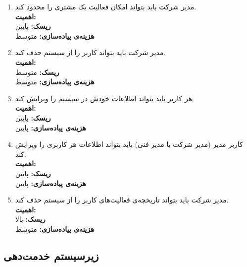 \begin{enumerate}
\item 
مدیر شرکت باید بتواند امکان فعالیت یک مشتری را محدود کند.
\\
\textbf{اهمیت:} 
\\
\textbf{ریسک:} پایین
\\
\textbf{هزینه‌ی پیاده‌سازی:} متوسط
\item 
مدیر شرکت باید بتواند کاربر را از سیستم حذف کند.
\\
\textbf{اهمیت:} 
\\
\textbf{ریسک:} متوسط
\\
\textbf{هزینه‌ی پیاده‌سازی:} متوسط

\item 
هر کاربر باید بتواند اطلاعات خودش در سیستم را ویرایش کند.
 \\
\textbf{اهمیت:} 
\\
\textbf{ریسک:} پایین
\\
\textbf{هزینه‌ی پیاده‌سازی:} پایین
\item 
کاربر مدیر ‌(مدیر شرکت یا مدیر فنی) باید بتواند اطلاعات هر کاربری را ویرایش کند.
 \\
\textbf{اهمیت:} 
\\
\textbf{ریسک:} پایین
\\
\textbf{هزینه‌ی پیاده‌سازی:} پایین

\item 
مدیر شرکت باید بتواند تاریخچه‌ی فعالیت‌های کاربر را از سیستم حذف کند.
\\
\textbf{اهمیت:} 
\\
\textbf{ریسک:} بالا
\\
\textbf{هزینه‌ی پیاده‌سازی:} متوسط


\end{enumerate}


\subsection{زیرسیستم خدمت‌دهی}


